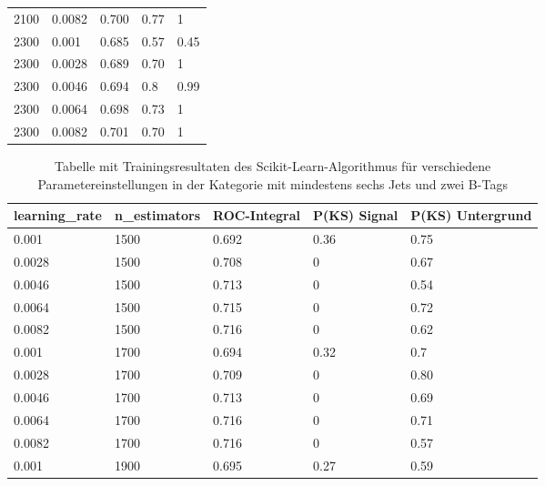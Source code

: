 \begin{table}[tbp]
\begin{center}
\begin{tabular}{lllll}
\num{2100} & \num{0.0082} & \num{0,700} & \num{0,77} & \num{1}\\
\num{2300} & \num{0.001}  & \num{0,685} & \num{0,57} & \num{0,45}\\
\num{2300} & \num{0.0028} & \num{0,689} & \num{0,70} & \num{1}\\
\num{2300} & \num{0.0046} & \num{0,694} & \num{0,8}  & \num{0,99}\\
\num{2300} & \num{0.0064} & \num{0,698} & \num{0,73} & \num{1}\\
\num{2300} & \num{0.0082} & \num{0,701} & \num{0,70} & \num{1}\\
  \hline
  \end{tabular}
  \end{center}
\end{table}

\begin{table}[tbp]\parbox{12cm}{
\renewcommand\thetable{A.4}
  \caption[Scikit-Learn 6j2t Ergebnisse]{Tabelle mit Trainingsresultaten des Scikit-Learn-Algorithmus f\"ur verschiedene Parametereinstellungen in der Kategorie mit mindestens sechs Jets und zwei B-Tags}%
  }\label{tab:sklearn_6j2t}
  \begin{center}
  \begin{tabular}{lllll}
  \hline
  learning\_rate & n\_estimators & ROC-Integral & P(KS) Signal & P(KS) Untergrund\\
  \hline
\num{0,001}  & \num{1500} & \num{0,692} & \num{0,36} & \num{0,75}\\
\num{0,0028} & \num{1500} & \num{0,708} & \num{0}    & \num{0,67}\\
\num{0,0046} & \num{1500} & \num{0,713} & \num{0}    & \num{0,54}\\
\num{0,0064} & \num{1500} & \num{0,715} & \num{0}    & \num{0,72}\\
\num{0,0082} & \num{1500} & \num{0,716} & \num{0}    & \num{0,62}\\
\num{0,001}  & \num{1700} & \num{0,694} & \num{0,32} & \num{0,7}\\
\num{0,0028} & \num{1700} & \num{0,709} & \num{0}    & \num{0,80}\\
\num{0,0046} & \num{1700} & \num{0,713} & \num{0}    & \num{0,69}\\
\num{0,0064} & \num{1700} & \num{0,716} & \num{0}    & \num{0,71}\\
\num{0,0082} & \num{1700} & \num{0,716} & \num{0}    & \num{0,57}\\
\num{0,001}  & \num{1900} & \num{0,695} & \num{0,27} & \num{0,59}\\

\end{tabular}
\end{center}
\end{table}
